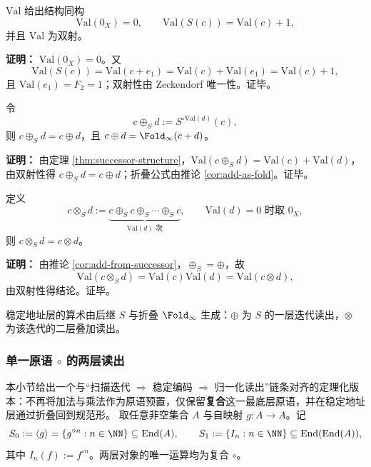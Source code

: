 \begin{theorem}[后继结构同构]\label{thm:successor-structure}
$\mathrm{Val}$ 给出结构同构
\[
\mathrm{Val}(0_X)=0,\qquad \mathrm{Val}(S(c))=\mathrm{Val}(c)+1,
\]
并且 $\mathrm{Val}$ 为双射。
\end{theorem}

\textbf{证明：}
$\mathrm{Val}(0_X)=0$。又
\[
\mathrm{Val}(S(c))=\mathrm{Val}(c+e_1)=\mathrm{Val}(c)+\mathrm{Val}(e_1)=\mathrm{Val}(c)+1,
\]
且 $\mathrm{Val}(e_1)=F_2=1$；双射性由 Zeckendorf 唯一性。证毕。

\begin{corollary}[加法由后继迭代给出]\label{cor:add-from-successor}
令
\[
c\oplus_S d:=S^{\circ\mathrm{Val}(d)}(c),
\]
则 $c\oplus_S d=c\oplus d$，且 $c\oplus d=\Fold_\infty(c+d)$。
\end{corollary}

\textbf{证明：}
由定理 \ref{thm:successor-structure}，$\mathrm{Val}(c\oplus_S d)=\mathrm{Val}(c)+\mathrm{Val}(d)$，由双射性得 $c\oplus_S d=c\oplus d$；折叠公式由推论 \ref{cor:add-as-fold}。证毕。

\begin{theorem}[乘法由后继迭代内生]\label{thm:mul-from-successor}
定义
\[
c\otimes_S d:=\underbrace{c\oplus_S c\oplus_S\cdots\oplus_S c}_{\mathrm{Val}(d)\text{ 次}},
\qquad \mathrm{Val}(d)=0\text{ 时取 }0_X,
\]
则 $c\otimes_S d=c\otimes d$。
\end{theorem}

\textbf{证明：}
由推论 \ref{cor:add-from-successor}，$\oplus_S=\oplus$，故
\[
\mathrm{Val}(c\otimes_S d)=\mathrm{Val}(c)\mathrm{Val}(d)=\mathrm{Val}(c\otimes d),
\]
由双射性得结论。证毕。

\begin{corollary}[极简原语集]\label{cor:primitive-minimal-successor}
稳定地址层的算术由后继 $S$ 与折叠 $\Fold_\infty$ 生成：$\oplus$ 为 $S$ 的一层迭代读出，$\otimes$ 为该迭代的二层叠加读出。
\end{corollary}

\subsubsection{单一原语 \texorpdfstring{$\circ$}{o} 的两层读出}\label{subsec:arith-composition}
本小节给出一个与“扫描迭代 $\Rightarrow$ 稳定编码 $\Rightarrow$ 归一化读出”链条对齐的定理化版本：不再将加法与乘法作为原语预置，仅保留\textbf{复合}这一最底层原语，并在稳定地址层通过折叠回到规范形。
取任意非空集合 $A$ 与自映射 $g:A\to A$。记
\[
S_0:=\langle g\rangle=\{g^{\circ n}:n\in\NN\}\subseteq \mathrm{End}(A),\qquad
S_1:=\{I_n:n\in\NN\}\subseteq \mathrm{End}(\mathrm{End}(A)),
\]
其中 $I_n(f):=f^{\circ n}$。两层对象的唯一运算均为复合 $\circ$。

